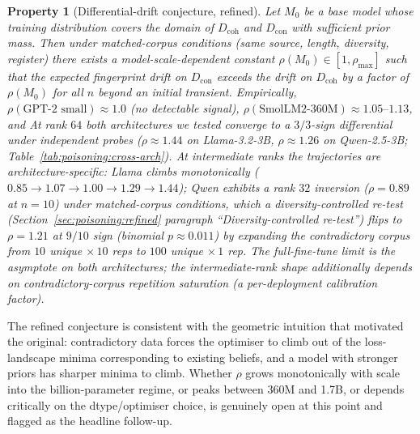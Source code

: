 \documentclass[11pt,a4paper]{article}
\newtheorem{property}{Property}
\begin{document}
\begin{property}[Differential\nobreakdash-drift conjecture, refined]
  Let $M_0$ be a base model whose training distribution covers the
  domain of $D_{\mathrm{coh}}$ and $D_{\mathrm{con}}$ with
  sufficient prior mass.  Then under matched\nobreakdash-corpus
  conditions (same source, length, diversity, register) there
  exists a model\nobreakdash-scale\nobreakdash-dependent constant
  $\rho(M_0) \in [1, \rho_{\max}]$ such that the expected
  fingerprint drift on $D_{\mathrm{con}}$ exceeds the drift on
  $D_{\mathrm{coh}}$ by a factor of $\rho(M_0)$ for all $n$
  beyond an initial transient.  Empirically,
  $\rho(\text{GPT-2 small}) \approx 1.0$ (no detectable signal),
  $\rho(\text{SmolLM2-360M}) \approx 1.05\text{--}1.13$, and
  At rank $64$ both architectures we tested converge to a
  $3/3$\nobreakdash-sign differential under independent probes
  ($\rho \approx 1.44$ on Llama-3.2-3B, $\rho \approx 1.26$ on
  Qwen-2.5-3B; Table~\ref{tab:poisoning:cross-arch}).  At
  intermediate ranks the trajectories are
  architecture\nobreakdash-specific: Llama climbs monotonically
  ($0.85 \to 1.07 \to 1.00 \to 1.29 \to 1.44$); Qwen exhibits
  a rank $32$ inversion ($\rho = 0.89$ at $n=10$) under
  matched\nobreakdash-corpus conditions, which a
  diversity\nobreakdash-controlled re\nobreakdash-test
  (Section~\ref{sec:poisoning:refined} paragraph
  ``Diversity\nobreakdash-controlled re\nobreakdash-test'')
  flips to $\rho = 1.21$ at $9/10$ sign (binomial
  $p \approx 0.011$) by expanding the contradictory corpus
  from $10$ unique $\times\,10$ reps to $100$ unique $\times\,1$
  rep.  The full\nobreakdash-fine\nobreakdash-tune limit is the
  asymptote on both architectures; the
  intermediate\nobreakdash-rank shape additionally depends on
  contradictory\nobreakdash-corpus repetition saturation
  (a per\nobreakdash-deployment calibration factor).
\end{property}

The refined conjecture is consistent with the geometric
intuition that motivated the original: contradictory data forces
the optimiser to climb out of the loss\nobreakdash-landscape
minima corresponding to existing beliefs, and a model with
stronger priors has sharper minima to climb.  Whether $\rho$
grows monotonically with scale into the billion\nobreakdash-parameter
regime, or peaks between 360M and 1.7B, or depends critically on
the dtype/optimiser choice, is genuinely open at this point and
flagged as the headline follow\nobreakdash-up.
\end{document}
